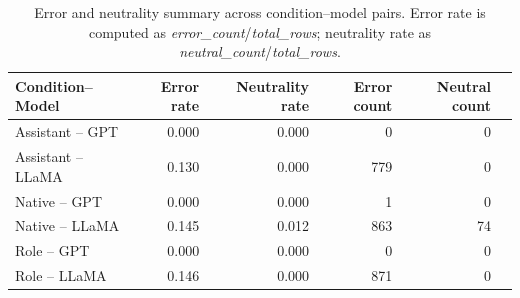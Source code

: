 \begin{table}[ht]
  \centering
  \begin{tabular}{lrrrrr}
    \toprule
    \textbf{Condition--Model} & \textbf{Error rate} & \textbf{Neutrality rate} & \textbf{Error count} & \textbf{Neutral count} \\
    \midrule
    Assistant -- GPT   & 0.000 & 0.000 & 0   & 0   \\
    Assistant -- LLaMA & 0.130 & 0.000 & 779 & 0   \\
    Native -- GPT      & 0.000 & 0.000 & 1   & 0   \\
    Native -- LLaMA    & 0.145 & 0.012 & 863 & 74  \\
    Role -- GPT        & 0.000 & 0.000 & 0   & 0   \\
    Role -- LLaMA      & 0.146 & 0.000 & 871 & 0   \\
    \bottomrule
  \end{tabular}
  \caption{Error and neutrality summary across condition--model pairs. Error rate is computed as \textit{error\_count}/\textit{total\_rows}; neutrality rate as \textit{neutral\_count}/\textit{total\_rows}.}
  \label{tab:cond_model_error_neutral}
\end{table}

